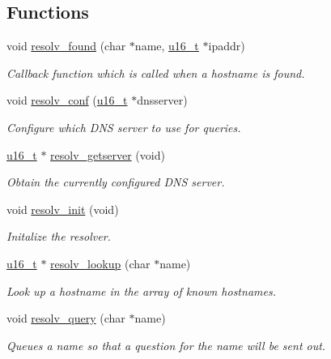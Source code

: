 \subsection*{Functions}
\begin{CompactItemize}
\item 
void \hyperlink{a00083_g6d9751d534453425c7a5a215d1d4414c}{resolv\_\-found} (char $\ast$name, \hyperlink{a00070_gfc6499c1f28697aa3bfc2804d496fd11}{u16\_\-t} $\ast$ipaddr)
\begin{CompactList}\small\item\em Callback function which is called when a hostname is found. \item\end{CompactList}\item 
void \hyperlink{a00083_gdf916e0c752f5cda70d0bddb2be422ba}{resolv\_\-conf} (\hyperlink{a00070_gfc6499c1f28697aa3bfc2804d496fd11}{u16\_\-t} $\ast$dnsserver)
\begin{CompactList}\small\item\em Configure which DNS server to use for queries. \item\end{CompactList}\item 
\hyperlink{a00070_gfc6499c1f28697aa3bfc2804d496fd11}{u16\_\-t} $\ast$ \hyperlink{a00083_g3191066cf8f76bd00b6843b77c37068f}{resolv\_\-getserver} (void)
\begin{CompactList}\small\item\em Obtain the currently configured DNS server. \item\end{CompactList}\item 
\hypertarget{a00083_gb50f78bbf36d912d69f6c1685d0b40e3}{
void \hyperlink{a00083_gb50f78bbf36d912d69f6c1685d0b40e3}{resolv\_\-init} (void)}
\label{a00083_gb50f78bbf36d912d69f6c1685d0b40e3}

\begin{CompactList}\small\item\em Initalize the resolver. \item\end{CompactList}\item 
\hyperlink{a00070_gfc6499c1f28697aa3bfc2804d496fd11}{u16\_\-t} $\ast$ \hyperlink{a00083_g66d19181ad5fe8b8f7c84d1f1d46a2ec}{resolv\_\-lookup} (char $\ast$name)
\begin{CompactList}\small\item\em Look up a hostname in the array of known hostnames. \item\end{CompactList}\item 
void \hyperlink{a00083_ge4dcbbe6c641d2e3b8537b479df5fc99}{resolv\_\-query} (char $\ast$name)
\begin{CompactList}\small\item\em Queues a name so that a question for the name will be sent out. \item\end{CompactList}\end{CompactItemize}


